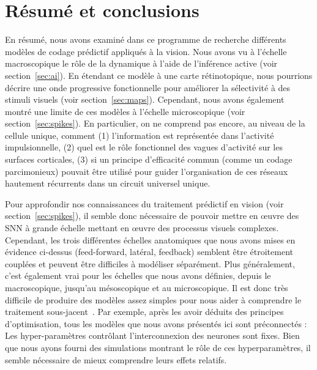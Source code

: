 \documentclass[11pt,french,a4paper,oneside]{article}%
\begin{document}
\section{Résumé et conclusions}
En résumé, nous avons examiné dans ce programme de recherche différents modèles de
codage prédictif appliqués à la vision. Nous avons vu à l'échelle
macroscopique le rôle de la dynamique à l'aide de l'inférence active
(voir section~\ref{sec:ai}). En étendant ce modèle à une carte rétinotopique, nous
pourrions décrire une onde progressive fonctionnelle pour améliorer la sélectivité à des
stimuli visuels (voir section~\ref{sec:maps}). Cependant, nous avons également montré
une limite de ces modèles à l'échelle microscopique (voir section~\ref{sec:spikes}). En
particulier, on ne comprend pas encore, au niveau de la cellule unique,
comment (1) l'information est représentée dans l'activité impulsionnelle, (2)
quel est le rôle fonctionnel des vagues d'activité sur les surfaces
corticales, (3) si un principe d'efficacité commun (comme un codage
parcimonieux) pouvait être utilisé pour guider l'organisation de ces réseaux
hautement récurrents dans un circuit universel unique.

Pour approfondir nos connaissances du traitement prédictif en vision
(voir section~\ref{sec:spikes}), il semble donc nécessaire de pouvoir mettre en œuvre
des SNN à grande échelle mettant en œuvre des processus visuels
complexes. Cependant, les trois différentes échelles anatomiques que
nous avons mises en évidence ci-dessus (feed-forward, latéral, feedback)
semblent être étroitement couplées et peuvent être difficiles à
modéliser séparément. Plus généralement, c'est également vrai pour les
échelles que nous avons définies, depuis le macroscopique, jusqu'au mésoscopique
et au microscopique. Il est donc très difficile de produire des modèles
assez simples pour nous aider à comprendre le traitement sous-jacent~\citep{Varoquaux19,Brette19}. Par exemple, après les avoir
déduits des principes d'optimisation, tous les modèles que nous avons
présentés ici sont préconnectés : Les hyper-paramètres contrôlant
l'interconnexion des neurones sont fixes. Bien que nous ayons fourni des
simulations montrant le rôle de ces hyperparamètres, il semble
nécessaire de mieux comprendre leurs effets relatifs. %
\end{document}
